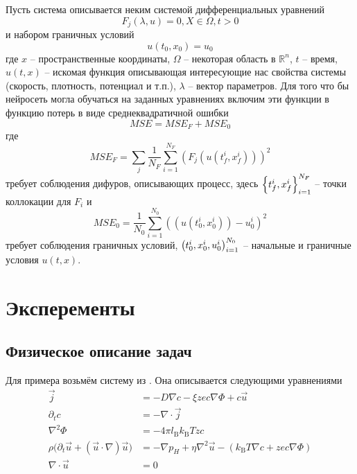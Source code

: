 \documentclass[a4paper,12pt]{article} %
\begin{document}
Пусть система описывается неким системой дифференциальных уравнений
\begin{equation}F_j(\lambda, u) = 0, X\in\Omega, t > 0\end{equation}
и набором граничных условий
\begin{equation}u(t_0, x_0) = u_0\end{equation}
где $x$ -- пространственные координаты, $\Omega$ -- некоторая область в $\mathbb{R}^n$, $t$ -- время, $u(t,x)$ -- искомая функция описывающая интересующие нас свойства системы (скорость, плотность, потенциал и т.п.), $\lambda$ -- вектор параметров. Для того что бы нейросеть могла обучаться на заданных уравнениях включим эти функции в функцию потерь в виде среднеквадратичной ошибки
\begin{equation}
    MSE = MSE_F + MSE_0
\end{equation}
где
\begin{equation}
    MSE_F = \sum_j\frac{1}{N_F}\sum_{i=1}^{N_F} (F_j(u(t^i_f, x^i_f)))^2
\end{equation}
требует соблюдения дифуров, описывающих процесс, здесь ${\left\{ t^i_f, x^i_f \right\}}_{i=1}^{N_F}$ -- точки коллокации для $F_i$ и
\begin{equation}
    MSE_0 = \frac{1}{N_0}\sum_{i=1}^{N_0} ((u(t^i_0, x^i_0)) - u^i_0)^2
\end{equation}
требует соблюдения граничных условий, ${\left( t^i_0, x^i_0, u^i_0 \right)}_{i=1}^{N_0}$ -- начальные и граничные условия $u(t,x)$.

\newpage

\section{Эксперементы}

\subsection{Физическое описание задач}

Для примера возьмём систему из \cite{bib:tutor}. Она описывается следующими уравнениями
$$\begin{aligned}
        \vec{j}                                                               & =
        -D \nabla c - \xi z e c \nabla \Phi + c \vec{u}                                      \\
        \partial_{t} c                                                        & =
        -\nabla \cdot\vec{j}                                                                 \\
        \nabla^2 \Phi                                                         & =
        -4 \pi l_\mathrm{B} k_\mathrm{B}T z c                                                \\
        \rho \big( \partial_t \vec{u} + (\vec{u} \cdot \nabla ) \vec{u} \big) & =
        -\nabla p_H + \eta \nabla^{2} \vec{u} - (k_\mathrm{B}T \nabla c + zec \nabla \Phi) \\
        \nabla \cdot \vec{u}                                                  & =
        0
    \end{aligned}$$
\end{document}
